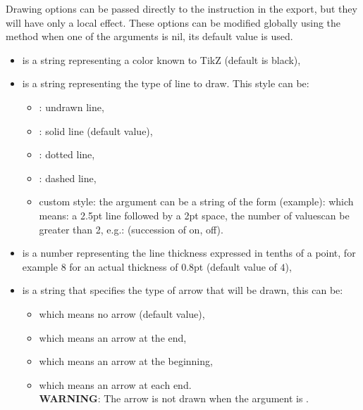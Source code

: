 Drawing options can be passed directly to the \drawcmd instruction in the export, but they will have only a local effect. These options can be modified globally using the method
 when one of the arguments is nil, its default value is used.

\begin{itemize}
    \item {} is a string representing a color known to TikZ (default is black),
    \item {} is a string representing the type of line to draw. This style can be:
    \begin{itemize}
        \item {}: undrawn line,
        \item {}: solid line (default value),
        \item {}: dotted line,
        \item {}: dashed line,
        \item custom style: the  argument can be a string of the form (example):  which means: a 2.5pt line followed by a 2pt space, the number of values ​​can be greater than 2, e.g.:  (succession of on, off).
    \end{itemize}
    \item {} is a number representing the line thickness expressed in tenths of a point, for example $8$ for an actual thickness of 0.8pt (default value of $4$),
    \item {} is a string that specifies the type of arrow that will be drawn, this can be:
    \begin{itemize}
        \item {} which means no arrow (default value),
        \item {} which means an arrow at the end,
        \item {} which means an arrow at the beginning,
        \item {} which means an arrow at each end.\\
    \textbf{WARNING}: The arrow is not drawn when the argument  is \true. 
    \end{itemize}
\end{itemize}

